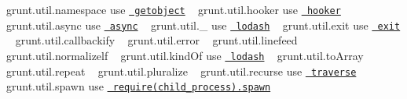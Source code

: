 {\ttfamily grunt.\+util.\+namespace} use \href{https://www.npmjs.org/package/getobject}{\texttt{ getobject}} ~\newline
 {\ttfamily grunt.\+util.\+hooker} use \href{https://www.npmjs.org/package/hooker}{\texttt{ hooker}} ~\newline
 {\ttfamily grunt.\+util.\+async} use \href{https://www.npmjs.org/package/async}{\texttt{ async}} ~\newline
 {\ttfamily grunt.\+util.\+\_\+} use \href{https://www.npmjs.org/package/lodash}{\texttt{ lodash}} ~\newline
 {\ttfamily grunt.\+util.\+exit} use \href{https://www.npmjs.org/package/exit}{\texttt{ exit}} ~\newline
 {\ttfamily grunt.\+util.\+callbackify} ~\newline
 {\ttfamily grunt.\+util.\+error} ~\newline
 {\ttfamily grunt.\+util.\+linefeed} ~\newline
 {\ttfamily grunt.\+util.\+normalizelf} ~\newline
 {\ttfamily grunt.\+util.\+kind\+Of} use \href{https://www.npmjs.org/package/lodash}{\texttt{ lodash}} ~\newline
 {\ttfamily grunt.\+util.\+to\+Array} {\ttfamily grunt.\+util.\+repeat} ~\newline
 {\ttfamily grunt.\+util.\+pluralize} ~\newline
 {\ttfamily grunt.\+util.\+recurse} use \href{https://www.npmjs.org/package/traverse}{\texttt{ traverse}} ~\newline
 {\ttfamily grunt.\+util.\+spawn} use \href{https://nodejs.org/api/child_process.html\#child_process_child_process_spawn_command_args_options}{\texttt{ require(\textquotesingle{}child\+\_\+process\textquotesingle{}).spawn}} ~\newline
 